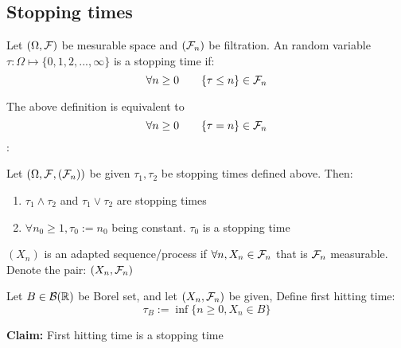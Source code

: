 \newpage
\subsection*{Stopping times}
\begin{dfn}
Let $(\Omega, \mathcal{F})$ be mesurable space and $(\mathcal{F}_n)$ be filtration. An random variable $\tau: \Omega \mapsto \{0,1,2, ..., \infty\}$ is a stopping time if:
\begin{equation*}
    \forall n\geq 0 \qquad \{\tau \leq n  \}\in\mathcal{F}_n
\end{equation*}
\end{dfn}

\begin{rem}
The above definition is equivalent to 
\begin{equation*}
    \forall n\geq 0 \qquad \{\tau = n  \}\in\mathcal{F}_n
\end{equation*}
\pf:
\vspace{4cm}
\end{rem}
\begin{lem}
Let $(\Omega, \mathcal{F}, (\mathcal{F}_n))$ be given $\tau_1, \tau_2$ be stopping times defined above. Then:
\begin{enumerate}
    \item $\tau_1\wedge \tau_2$ and $\tau_1\vee \tau_2$ are stopping times
    \item $\forall n_0 \geq 1, \tau_0 := n_0$ being constant. $\tau_0$ is a stopping time
\end{enumerate}
\end{lem}
\pf 
\vspace{8cm}
\begin{dfn} $(X_n)$ is an adapted sequence/process if $\forall n, X_n \in \mathcal{F}_n$ that is $\mathcal{F}_n$ measurable. Denote the pair: $(X_n, \mathcal{F}_n)$

\end{dfn}
\newpage
\begin{dfn}
Let $B\in \mathcal{B}(\mathbb{R})$ be Borel set, and let $(X_n, \mathcal{F}_n)$ be given, Define first hitting time: 
\begin{equation*}
    \tau_B := \inf \{n\geq 0, X_n\in B\}
\end{equation*}
\end{dfn}
\textbf{Claim:} First hitting time is a stopping time \\
\pf \vspace{4cm}

